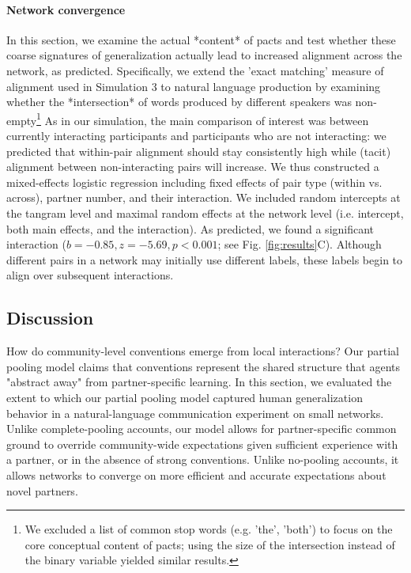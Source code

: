 \paragraph{Network convergence }

In this section, we examine the actual *content* of pacts and test whether these coarse signatures of generalization actually lead to increased alignment across the network, as predicted. 
Specifically, we extend the 'exact matching' measure of alignment used in Simulation 3 to natural language production by examining whether the *intersection* of words produced by different speakers was non-empty\footnote{We excluded a list of common stop words (e.g. 'the', 'both') to focus on the core conceptual content of pacts; using the size of the intersection instead of the binary variable yielded similar results.}
As in our simulation, the main comparison of interest was between currently interacting participants and participants who are not interacting: we predicted that within-pair alignment should stay consistently high while (tacit) alignment between non-interacting pairs will increase. 
We thus constructed a mixed-effects logistic regression including fixed effects of pair type (within vs. across), partner number, and their interaction.
We included random intercepts at the tangram level and maximal random effects at the network level (i.e. intercept, both main effects, and the interaction).
As predicted, we found a significant interaction ($b = -0.85, z = -5.69, p < 0.001$; see Fig. \ref{fig:results}C).
Although different pairs in a network may initially use different labels, these labels begin to align over subsequent interactions. 

\subsection{Discussion}

How do community-level conventions emerge from local interactions? 
Our partial pooling model claims that conventions represent the shared structure that agents "abstract away" from partner-specific learning.
In this section, we evaluated the extent to which our partial pooling model captured human generalization behavior in a natural-language communication experiment on small networks.
Unlike complete-pooling accounts, our model allows for partner-specific common ground to override community-wide expectations given sufficient experience with a partner, or in the absence of strong conventions.
Unlike no-pooling accounts, it allows networks to converge on more efficient and accurate expectations about novel partners.

